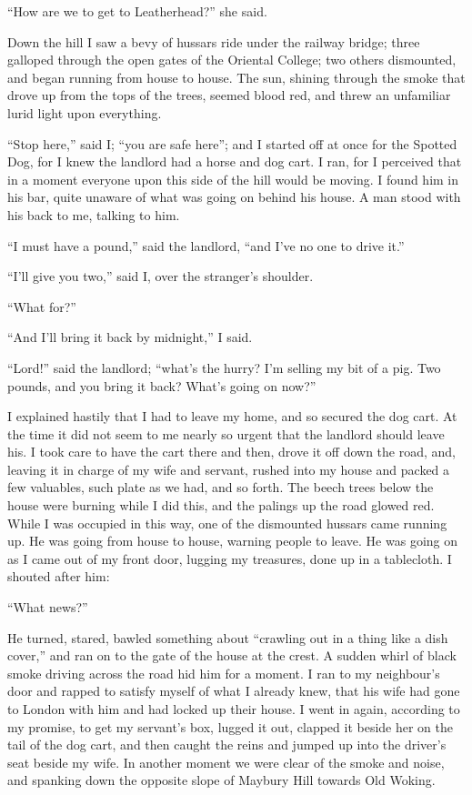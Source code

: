 ``How are we to get to Leatherhead?'' she said.

Down the hill I saw a bevy of hussars ride under the railway
bridge; three galloped through the open gates of the Oriental
College; two others dismounted, and began running from house to
house. The sun, shining through the smoke that drove up from the
tops of the trees, seemed blood red, and threw an unfamiliar lurid
light upon everything.

``Stop here,'' said I; ``you are safe here''; and I started off at once
for the Spotted Dog, for I knew the landlord had a horse and dog
cart. I ran, for I perceived that in a moment everyone upon this
side of the hill would be moving. I found him in his bar, quite
unaware of what was going on behind his house. A man stood with his
back to me, talking to him.

``I must have a pound,'' said the landlord, ``and I've no one to drive
it.''

``I'll give you two,'' said I, over the stranger's shoulder.

``What for?''

``And I'll bring it back by midnight,'' I said.

``Lord!'' said the landlord; ``what's the hurry? I'm selling my bit of
a pig. Two pounds, and you bring it back? What's going on now?''

I explained hastily that I had to leave my home, and so secured the
dog cart. At the time it did not seem to me nearly so urgent that
the landlord should leave his. I took care to have the cart there
and then, drove it off down the road, and, leaving it in charge of
my wife and servant, rushed into my house and packed a few
valuables, such plate as we had, and so forth. The beech trees
below the house were burning while I did this, and the palings up
the road glowed red. While I was occupied in this way, one of the
dismounted hussars came running up. He was going from house to
house, warning people to leave. He was going on as I came out of my
front door, lugging my treasures, done up in a tablecloth. I
shouted after him:

``What news?''

He turned, stared, bawled something about ``crawling out in a thing
like a dish cover,'' and ran on to the gate of the house at the
crest. A sudden whirl of black smoke driving across the road hid
him for a moment. I ran to my neighbour's door and rapped to
satisfy myself of what I already knew, that his wife had gone to
London with him and had locked up their house. I went in again,
according to my promise, to get my servant's box, lugged it out,
clapped it beside her on the tail of the dog cart, and then caught
the reins and jumped up into the driver's seat beside my wife. In
another moment we were clear of the smoke and noise, and spanking
down the opposite slope of Maybury Hill towards Old Woking.

